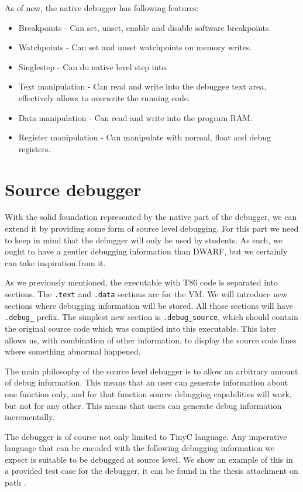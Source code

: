 As of now, the native debugger has following features:
\begin{itemize}
    \item Breakpoints - Can set, unset, enable and disable software breakpoints.
    \item Watchpoints - Can set and unset watchpoints on memory writes.
    \item Singlestep - Can do native level step into.
    \item Text manipulation - Can read and write into the debuggee text area,
        effectively allows to overwrite the running code.
    \item Data manipulation - Can read and write into the program RAM.
    \item Register manipulation - Can manipulate with normal, float and debug registers.
\end{itemize}

\section{Source debugger}
With the solid foundation represented by the native part of the debugger, we
can extend it by providing some form of source level debugging. For this part
we need to keep in mind that the debugger will only be used by students.
As such, we ought to have a gentler debugging information than DWARF,
but we certainly can take inspiration from it.

As we previously mentioned, the executable with T86 code is separated into sections.
The \texttt{.text} and \texttt{.data} sections are for the VM. We will introduce new
sections where debugging information will be stored. All those sections will have
\texttt{.debug\_} prefix. The simplest new section is \texttt{.debug\_source}, which
should contain the original source code which was compiled into this executable.
This later allows us, with combination of other information, to display the source
code lines where something abnormal happened.

The main philosophy of the source level debugger is to allow an arbitrary
amount of debug information. This means that an user can generate information
about one function only, and for that function source debugging capabilities
will work, but not for any other. This means that users can generate debug
information incrementally.

The debugger is of course not only limited to TinyC language. Any imperative
language that can be encoded with the following debugging information we expect
is suitable to be debugged at source level. We show an example of this in a
provided test case for the debugger, it can be found in the thesis attachment
on path .

